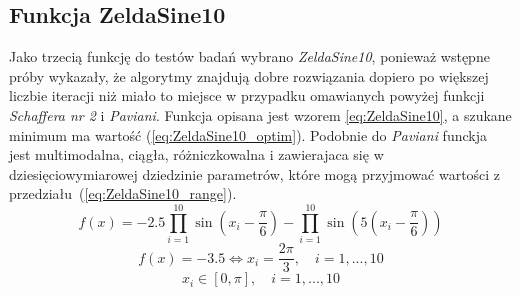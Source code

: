 \subsection{Funkcja ZeldaSine10}
Jako trzecią funkcję do testów badań wybrano \emph{ZeldaSine10}, ponieważ wstępne próby wykazały, że algorytmy znajdują dobre rozwiązania dopiero po większej liczbie iteracji niż miało to miejsce w przypadku omawianych powyżej funkcji \emph{Schaffera nr 2} i \emph{Paviani}. Funkcja opisana jest wzorem \ref{eq:ZeldaSine10}, a szukane minimum ma wartość (\ref{eq:ZeldaSine10_optim}). Podobnie do \emph{Paviani} funckja jest multimodalna, ciągła, różniczkowalna i zawierajaca się w dziesięciowymiarowej dziedzinie parametrów, które mogą przyjmować wartości z przedziału~(\ref{eq:ZeldaSine10_range}). 
\begin{equation}\label{eq:ZeldaSine10}
f(x)=-2.5\prod_{i=1}^{10} \sin\left(x_i-\frac{\pi}{6}\right) - \prod_{i=1}^{10} \sin\left(5\left(x_i-\frac{\pi}{6}\right)\right)
\end{equation}
\begin{equation} \label{eq:ZeldaSine10_optim}
f(x)=-3.5 \Leftrightarrow x_i = \frac{2\pi}{3},\quad i = 1, ..., 10
\end{equation}
\begin{equation} \label{eq:ZeldaSine10_range}
x_i\in[0,\pi], \quad i=1,...,10
\end{equation}

